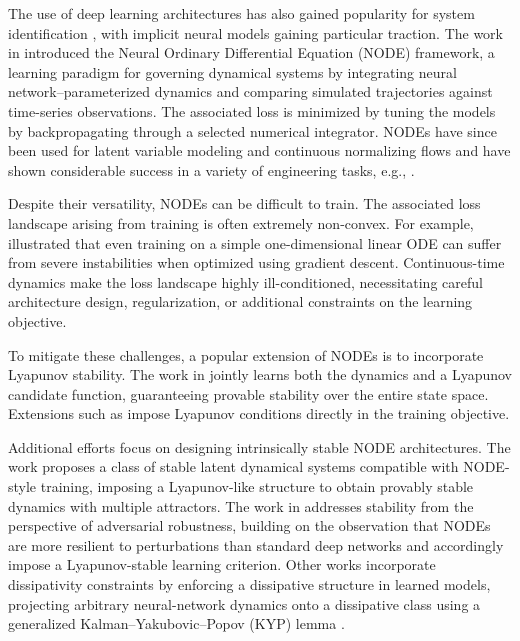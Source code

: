 \documentclass[11pt,twoside]{article}
\theoremstyle{plain}
\theoremstyle{definition}
\theoremstyle{remark}
\begin{document}
The use of deep learning architectures has also gained popularity for system identification \cite{PILLONETTO2025111907, LJUNG20201175}, with implicit neural models gaining particular traction. The work in \cite{chen2018neural} introduced the Neural Ordinary Differential Equation (NODE) framework, a learning paradigm for governing dynamical systems by integrating neural network–parameterized dynamics and comparing simulated trajectories against time-series observations. The associated loss is minimized by tuning the models by backpropagating through a selected numerical integrator. NODEs have since been used for latent variable modeling and continuous normalizing flows and have shown considerable success in a variety of engineering tasks, e.g., \cite{Koch2025Neural,koch2025contactdatadrivenfrictionstirprocess, koch2024atmospheric,koch2024gnde}.


Despite their versatility, NODEs can be difficult to train. The associated loss landscape arising from training is often extremely non-convex. For example, \cite{okamoto2025learningsimplestneuralode} illustrated that even training on a simple one-dimensional linear ODE can suffer from severe instabilities when optimized using gradient descent. Continuous-time dynamics make the loss landscape highly ill-conditioned, necessitating careful architecture design, regularization, or additional constraints on the learning objective.

To mitigate these challenges, a popular extension of NODEs is to incorporate Lyapunov stability. The work in \cite{Kolter2019LearningSD} jointly learns both the dynamics and a Lyapunov candidate function, guaranteeing provable stability over the entire state space. Extensions such as \cite{ wu2023neural, sochopoulos2024learningdeepdynamicalsystems,kang2021stableneuralodelyapunovstable} impose Lyapunov conditions directly in the training objective.

Additional efforts focus on designing intrinsically stable NODE architectures. The work \cite{sochopoulos2024learningdeepdynamicalsystems} proposes a class of stable latent dynamical systems compatible with NODE-style training, imposing a Lyapunov-like structure to obtain provably stable dynamics with multiple attractors. The work in \cite{kang2021stableneuralodelyapunovstable} addresses stability from the perspective of adversarial robustness, building on the observation that NODEs are more resilient to perturbations than standard deep networks \cite{yan2020robustness} and accordingly impose a Lyapunov-stable learning criterion. Other works incorporate dissipativity constraints by enforcing a dissipative structure in learned models, projecting arbitrary neural-network dynamics onto a dissipative class using a generalized Kalman–Yakubovic–Popov (KYP) lemma \cite{okamoto2024learningdeepdissipativedynamics}.
\end{document}
